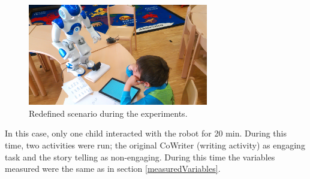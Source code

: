 \begin{figure}[h!]
        \centering
        \includegraphics[width=0.7\textwidth]{figures/experiment.jpg}
        \caption{Redefined scenario during the experiments.}
        \label{fig:experiment}
\end{figure}

In this case, only one child interacted with the robot for 20 min. During this time, two activities were run; the original CoWriter (writing activity) as engaging task and the story telling as non-engaging. During this time the variables measured were the same as in section \ref{measuredVariables}.

